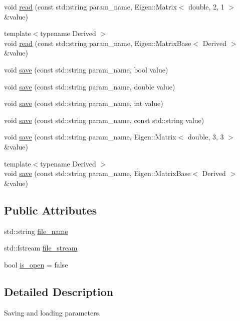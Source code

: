 \begin{DoxyCompactItemize}
\item 
void \hyperlink{classfdcl_1_1param_a79eb91ca476a68d0daf23f356b718f10}{read} (const std\+::string param\+\_\+name, Eigen\+::\+Matrix$<$ double, 2, 1 $>$ \&value)
\item 
{\footnotesize template$<$typename Derived $>$ }\\void \hyperlink{classfdcl_1_1param_a820d2ab0b0910a7e53388914953e2a01}{read} (const std\+::string param\+\_\+name, Eigen\+::\+Matrix\+Base$<$ Derived $>$ \&value)
\item 
void \hyperlink{classfdcl_1_1param_a92916790e30320117f5d4e69eeb84fd5}{save} (const std\+::string param\+\_\+name, bool value)
\item 
void \hyperlink{classfdcl_1_1param_a44a08064a961e6c61a3bb9c930445aba}{save} (const std\+::string param\+\_\+name, double value)
\item 
void \hyperlink{classfdcl_1_1param_a3801f11c03171d4346b850b7b9cab38c}{save} (const std\+::string param\+\_\+name, int value)
\item 
void \hyperlink{classfdcl_1_1param_a96a6f27bab029853927eea056d5e1934}{save} (const std\+::string param\+\_\+name, const std\+::string value)
\item 
void \hyperlink{classfdcl_1_1param_a15963ddd16897fa57c4cf29813f95103}{save} (const std\+::string param\+\_\+name, Eigen\+::\+Matrix$<$ double, 3, 3 $>$ \&value)
\item 
{\footnotesize template$<$typename Derived $>$ }\\void \hyperlink{classfdcl_1_1param_abb3fdf67304f6ae93b5298ac3c81cfcf}{save} (const std\+::string param\+\_\+name, Eigen\+::\+Matrix\+Base$<$ Derived $>$ \&value)
\end{DoxyCompactItemize}
\subsection*{Public Attributes}
\begin{DoxyCompactItemize}
\item 
std\+::string \hyperlink{classfdcl_1_1param_a1302a367e87eb43e7bd658c2b7214951}{file\+\_\+name}
\item 
std\+::fstream \hyperlink{classfdcl_1_1param_a377cfc132a8f0ad93c3bf6c22a6e21e8}{file\+\_\+stream}
\item 
bool \hyperlink{classfdcl_1_1param_a1b19aff80fe92fc5e5b8b994744830eb}{is\+\_\+open} = false
\end{DoxyCompactItemize}


\subsection{Detailed Description}
Saving and loading parameters. 

